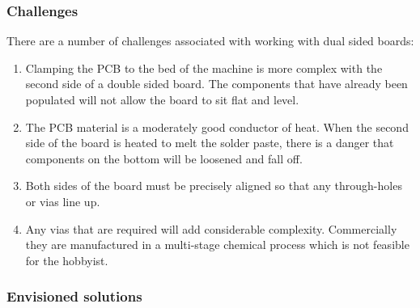 \subsubsection{Challenges}
There are a number of challenges associated with working with dual sided boards:

\begin{enumerate}
	\item	Clamping the PCB to the bed of the machine is more complex with the second side of a double sided board. The components that have
			already been populated will not allow the board to sit flat and level.
	\item	The PCB material is a moderately good conductor of heat. When the second side of the board is heated to melt the solder paste, there
			is a danger that components on the bottom will be loosened and fall off.
	\item	Both sides of the board must be precisely aligned so that any through-holes or vias line up.
	\item	Any vias that are required will add considerable complexity. Commercially they are manufactured in a multi-stage chemical process
			which is not feasible for the hobbyist.
\end{enumerate}

\subsubsection{Envisioned solutions}

